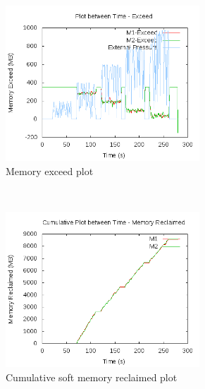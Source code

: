 	  \begin{figure}[t!]
	    \centering
	    \begin{subfigure}[t]{0.48\textwidth}
	      \centering
	      \includegraphics[width=0.8\textwidth]{images/controller_issues/exceed_only/Exceed.png}
	      \caption{Memory exceed plot}
	      \label{img_exceed_only_1_exceed}
	    \end{subfigure}
	    ~ 
	    \begin{subfigure}[t]{0.48\textwidth}
	      \centering
	      \includegraphics[width=0.8\textwidth]{images/controller_issues/exceed_only/Memory_Reclaimed.png}
	      \caption{Cumulative soft memory reclaimed plot}
	      \label{img_exceed_only_1_smr}
	    \end{subfigure}
	    ~ 
	    \begin{subfigure}[t]{0.48\textwidth}
	      \centering

\end{subfigure}
\end{figure}
